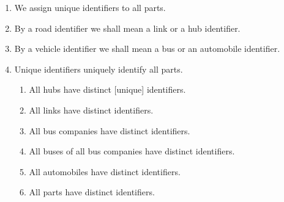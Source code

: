 \smallish\LLLL\HHHH\begin{enumerate}\setei
\item \label{p-x-ui-000} We assign unique identifiers to all parts.
\item \label{p-x-ui-004} By a road identifier we shall mean a link or a
                       hub identifier.
\item \label{p-x-ui-006} By a vehicle identifier we shall mean a bus or an
                       automobile identifier.
\item \label{p-x-ui-010} Unique identifiers uniquely identify all parts. 
\begin{enumerate}
\item \label{p-x-ui-020} All hubs have distinct [unique] identifiers.
\item \label{p-x-ui-030} All links have distinct identifiers. 
\item \label{p-x-ui-040} All bus companies have distinct
                       identifiers. 
\item \label{p-x-ui-050} All buses of all bus companies have distinct 
                       identifiers.
\item \label{p-x-ui-060} All automobiles have distinct identifiers.
\item \label{p-x-ui-070} All parts have  distinct identifiers.
\end{enumerate}
\savei\end{enumerate}
\pos{\end{multicols}}{}
\pos{\psno}{\mnewfoil}\HHHH
{}
